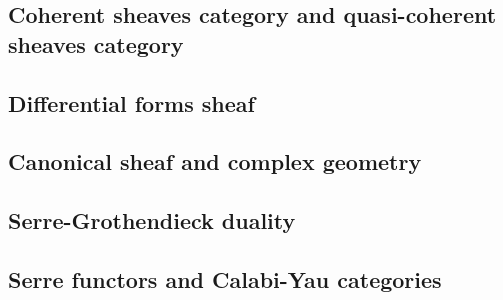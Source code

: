\subsection{Coherent sheaves category and quasi-coherent sheaves category}
	
\subsection{Differential forms sheaf}
	
\subsection{Canonical sheaf and complex geometry}
	
\subsection{Serre-Grothendieck duality}
	
\subsection{Serre functors and Calabi-Yau categories}
	
